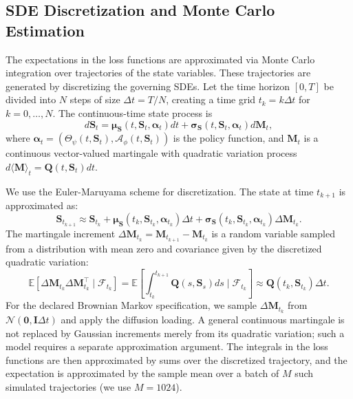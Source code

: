 \documentclass[ecta]{econsocart}
\theoremstyle{plain}
\theoremstyle{remark}
\newcommand{\E}{\mathbb{E}}
\newcommand{\statevec}{\bm{S}}
\newcommand{\controlvec}{\bm{\alpha}}
\newcommand{\driftvec}{\bm{\mu}}
\newcommand{\diffvec}{\bm{\sigma}}
\begin{document}
\subsection{SDE Discretization and Monte Carlo Estimation}
The expectations in the loss functions are approximated via Monte Carlo integration over trajectories of the state variables. These trajectories are generated by discretizing the governing SDEs. Let the time horizon $[0, T]$ be divided into $N$ steps of size $\Delta t = T/N$, creating a time grid $t_k = k\Delta t$ for $k=0, \dots, N$. The continuous-time state process is
\begin{equation}
d\statevec_t = \driftvec_{\statevec}(t, \statevec_t, \controlvec_t) dt + \diffvec_{\statevec}(t, \statevec_t, \controlvec_t) d\bm{M}_t,
\end{equation}
where $\controlvec_t = (\Theta_\psi(t,\statevec_t), \mathcal{A}_\phi(t,\statevec_t))$ is the policy function, and $\bm{M}_t$ is a continuous vector-valued martingale with quadratic variation process $d\langle \bm{M} \rangle_t = \bm{Q}(t, \statevec_t) dt$.

We use the Euler-Maruyama scheme for discretization. The state at time $t_{k+1}$ is approximated as:
\begin{equation}
\statevec_{t_{k+1}} \approx \statevec_{t_k} + \driftvec_{\statevec}(t_k, \statevec_{t_k}, \controlvec_{t_k}) \Delta t + \diffvec_{\statevec}(t_k, \statevec_{t_k}, \controlvec_{t_k}) \Delta \bm{M}_{t_k}.
\end{equation}
The martingale increment $\Delta \bm{M}_{t_k} = \bm{M}_{t_{k+1}} - \bm{M}_{t_k}$ is a random variable sampled from a distribution with mean zero and covariance given by the discretized quadratic variation:
\begin{equation}
\E[\Delta \bm{M}_{t_k} \Delta \bm{M}_{t_k}^\top \mid \mathcal{F}_{t_k}] = \E \left[ \int_{t_k}^{t_{k+1}} \bm{Q}(s, \statevec_s) ds \mid \mathcal{F}_{t_k} \right] \approx \bm{Q}(t_k, \statevec_{t_k}) \Delta t.
\end{equation}
For the declared Brownian Markov specification, we sample $\Delta \bm{M}_{t_k}$ from $\mathcal{N}(\bm{0},\bm{I}\Delta t)$ and apply the diffusion loading. A general continuous martingale is not replaced by Gaussian increments merely from its quadratic variation; such a model requires a separate approximation argument. The integrals in the loss functions are then approximated by sums over the discretized trajectory, and the expectation is approximated by the sample mean over a batch of $M$ such simulated trajectories (we use $M=1024$).
\end{document}
